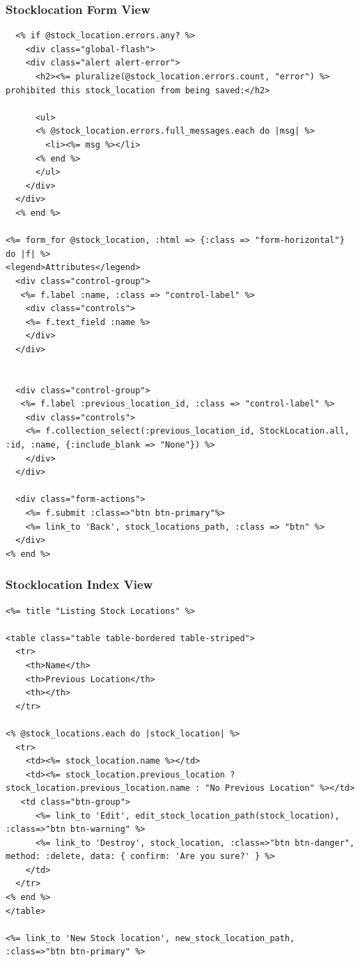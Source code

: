 \documentclass[a4paper]{article}
\begin{document}
\subsubsection{Stocklocation Form View}
\begin{verbatim}
  <% if @stock_location.errors.any? %>
    <div class="global-flash">
    <div class="alert alert-error">
      <h2><%= pluralize(@stock_location.errors.count, "error") %> prohibited this stock_location from being saved:</h2>

      <ul>
      <% @stock_location.errors.full_messages.each do |msg| %>
        <li><%= msg %></li>
      <% end %>
      </ul>
    </div>
  </div>
  <% end %>

<%= form_for @stock_location, :html => {:class => "form-horizontal"}  do |f| %>
<legend>Attributes</legend>
  <div class="control-group">
   <%= f.label :name, :class => "control-label" %>
    <div class="controls">
    <%= f.text_field :name %>
    </div>
  </div>


  <div class="control-group">
   <%= f.label :previous_location_id, :class => "control-label" %>
    <div class="controls">
    <%= f.collection_select(:previous_location_id, StockLocation.all, :id, :name, {:include_blank => "None"}) %>
    </div>
  </div>

  <div class="form-actions">
    <%= f.submit :class=>"btn btn-primary"%>
    <%= link_to 'Back', stock_locations_path, :class => "btn" %>
  </div>
<% end %>

\end{verbatim}
\subsubsection{Stocklocation Index View}
\begin{verbatim}
<%= title "Listing Stock Locations" %>

<table class="table table-bordered table-striped">
  <tr>
    <th>Name</th>
    <th>Previous Location</th>
    <th></th>
  </tr>

<% @stock_locations.each do |stock_location| %>
  <tr>
    <td><%= stock_location.name %></td>
    <td><%= stock_location.previous_location ? stock_location.previous_location.name : "No Previous Location" %></td>
   <td class="btn-group">
      <%= link_to 'Edit', edit_stock_location_path(stock_location), :class=>"btn btn-warning" %>
      <%= link_to 'Destroy', stock_location, :class=>"btn btn-danger", method: :delete, data: { confirm: 'Are you sure?' } %>
    </td>
  </tr>
<% end %>
</table>

<%= link_to 'New Stock location', new_stock_location_path, :class=>"btn btn-primary" %>

\end{verbatim}
\end{document}
